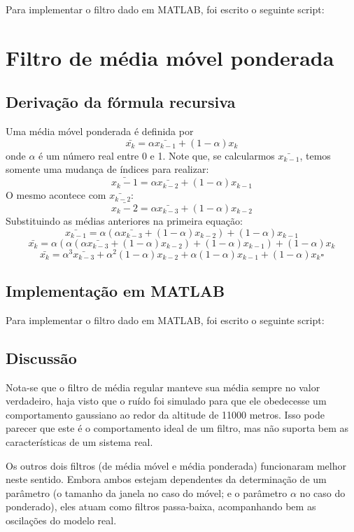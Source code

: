 \documentclass[12pt, a4paper, twoside]{article}
\begin{document}
Para implementar o filtro dado em MATLAB, foi escrito o seguinte script:


\section{Filtro de média móvel ponderada}

\subsection{Derivação da fórmula recursiva}

Uma média móvel ponderada é definida por
$$\bar{x_k}=\alpha\bar{x_{k-1}}+(1-\alpha)x_k$$
onde $\alpha$ é um número real entre 0 e 1. Note que, se calcularmos $\bar{x_{k-1}}$, temos somente uma mudança de índices para realizar:
$$\bar{x_k-1}=\alpha\bar{x_{k-2}}+(1-\alpha)x_{k-1}$$
O mesmo acontece com $\bar{x_{k-2}}$:
$$\bar{x_k-2}=\alpha\bar{x_{k-3}}+(1-\alpha)x_{k-2}$$
Substituindo as médias anteriores na primeira equação:
$$\bar{x_{k-1}}=\alpha(\alpha\bar{x_{k-3}}+(1-\alpha)x_{k-2})+(1-\alpha)x_{k-1}$$
$$\bar{x_{k}}=\alpha(\alpha(\alpha\bar{x_{k-3}}+(1-\alpha)x_{k-2})+(1-\alpha)x_{k-1})+(1-\alpha)x_k$$
$$\bar{x_k}=\alpha^3\bar{x_{k-3}}+\alpha^2(1-\alpha)x_{k-2}+\alpha(1-\alpha)x_{k-1}+(1-\alpha)x_k\square$$

\subsection{Implementação em MATLAB}

Para implementar o filtro dado em MATLAB, foi escrito o seguinte script:


\subsection{Discussão}

Nota-se que o filtro de média regular manteve sua média sempre no valor verdadeiro, haja visto que o ruído foi simulado para que ele obedecesse um comportamento gaussiano ao redor da altitude de 11000 metros. Isso pode parecer que este é o comportamento ideal de um filtro, mas não suporta bem as características de um sistema real.

Os outros dois filtros (de média móvel e média ponderada) funcionaram melhor neste sentido. Embora ambos estejam dependentes da determinação de um parâmetro (o tamanho da janela no caso do móvel; e o parâmetro $\alpha$ no caso do ponderado), eles atuam como filtros passa-baixa, acompanhando bem as oscilações do modelo real.
\end{document}
